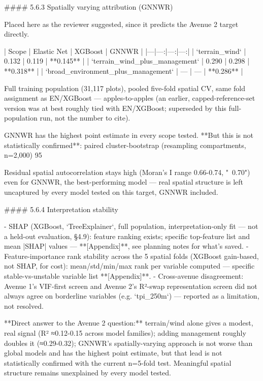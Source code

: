 #### 5.6.3 Spatially varying attribution (GNNWR)

Placed here as the reviewer suggested, since it predicts the Avenue 2 target directly.

| Scope | Elastic Net | XGBoost | GNNWR |
|---|---:|---:|---:|
| `terrain_wind` | 0.132 | 0.119 | **0.145** |
| `terrain_wind_plus_management` | 0.290 | 0.298 | **0.318** |
| `broad_environment_plus_management` | — | — | **0.286** |

Full training population (31,117 plots), pooled five-fold spatial CV, same fold assignment as EN/XGBoost — apples-to-apples (an earlier, capped-reference-set version was at best roughly tied with EN/XGBoost; superseded by this full-population run, not the number to cite).

GNNWR has the highest point estimate in every scope tested. **But this is not statistically confirmed**: paired cluster-bootstrap (resampling compartments, n=2,000) 95%

Residual spatial autocorrelation stays high (Moran's I range 0.66-0.74, "~0.70") even for GNNWR, the best-performing model — real spatial structure is left uncaptured by every model tested on this target, GNNWR included.

#### 5.6.4 Interpretation stability

- SHAP (XGBoost, `TreeExplainer`, full population, interpretation-only fit — not a held-out evaluation, §4.9): feature ranking exists; specific top-feature list and mean |SHAP| values — **[Appendix]**, see planning notes for what's saved.
- Feature-importance rank stability across the 5 spatial folds (XGBoost gain-based, not SHAP, for cost): mean/std/min/max rank per variable computed — specific stable-vs-unstable variable list **[Appendix]**.
- Cross-avenue disagreement: Avenue 1's VIF-first screen and Avenue 2's R²-swap representation screen did not always agree on borderline variables (e.g. `tpi_250m`) — reported as a limitation, not resolved.

**Direct answer to the Avenue 2 question:** terrain/wind alone gives a modest, real signal (R² ≈0.12-0.15 across model families); adding management roughly doubles it (≈0.29-0.32); GNNWR's spatially-varying approach is not worse than global models and has the highest point estimate, but that lead is not statistically confirmed with the current n=5-fold test. Meaningful spatial structure remains unexplained by every model tested.


